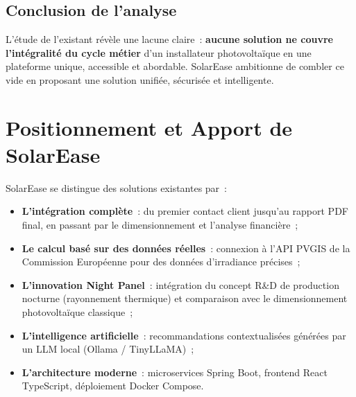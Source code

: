 \subsection{Conclusion de l'analyse}

L'étude de l'existant révèle une lacune claire~: \textbf{aucune solution
ne couvre l'intégralité du cycle métier} d'un installateur photovoltaïque
en une plateforme unique, accessible et abordable. SolarEase ambitionne
de combler ce vide en proposant une solution unifiée, sécurisée et intelligente.

\section{Positionnement et Apport de SolarEase}

SolarEase se distingue des solutions existantes par~:
\begin{itemize}
  \item \textbf{L'intégration complète}~: du premier contact client jusqu'au
    rapport PDF final, en passant par le dimensionnement et l'analyse financière~;
  \item \textbf{Le calcul basé sur des données réelles}~: connexion à l'API
    PVGIS de la Commission Européenne pour des données d'irradiance précises~;
  \item \textbf{L'innovation Night Panel}~: intégration du concept R\&D de
    production nocturne (rayonnement thermique) et comparaison avec le
    dimensionnement photovoltaïque classique~;
  \item \textbf{L'intelligence artificielle}~: recommandations contextualisées
    générées par un LLM local (Ollama / TinyLLaMA)~;
  \item \textbf{L'architecture moderne}~: microservices Spring Boot, frontend
    React TypeScript, déploiement Docker Compose.
\end{itemize}

\begin{center}
\end{center}

